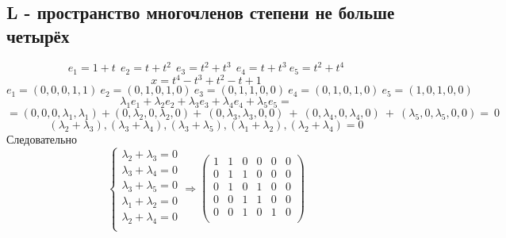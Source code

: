 \documentclass{article}
\begin{document}
\subsection*{L - пространство многочленов степени не больше четырёх}
$$
  e_1=1+t\ \ e_2=t+t^2\ \ e_3=t^2+t^3\ \ e_4=t+t^3\ e_5=t^2+t^4
$$$$
  x=t^4-t^3+t^2-t+1$$$$
  e_1=(0,0,0,1,1)\ e_2=(0,1,0,1,0){\ e}_3=(0,1,1,0,0)\ e_4=(0,1,0,1,0)\ e_5=(1,0,1,0,0) $$
$$
  \lambda_1e_1+\lambda_2e_2+\lambda_3e_3+\lambda_4e_4+\lambda_5e_5= $$$$
  =(0,0,0,\lambda_1,\lambda_1)+(0,\lambda_2,0,\lambda_2,0)+\ (0,\lambda_3,\lambda_3,0,0)\ +\ (0,\lambda_4,0,\lambda_4,0)\ +\ (\lambda_5,0,\lambda_5,0,0) =\ 0\ $$$$
  (\lambda_2+\lambda_3),(\lambda_3+\lambda_4),(\lambda_3+\lambda_5),(\lambda_1+\lambda_2),(\lambda_2+\lambda_4) =0
$$
Следовательно $$
  \left\{\begin{array}{c}
    \lambda_2+\lambda_3=0 \\
    \lambda_3+\lambda_4=0 \\
    \lambda_3+\lambda_5=0 \\
    \lambda_1+\lambda_2=0 \\
    \lambda_2+\lambda_4=0 \\
  \end{array}\right. \Rightarrow \left(\begin{array}{ccccc|c}
      1 & 1 & 0 & 0 & 0 & 0 \\
      0 & 1 & 1 & 0 & 0 & 0 \\
      0 & 1 & 0 & 1 & 0 & 0 \\
      0 & 0 & 1 & 1 & 0 & 0 \\
      0 & 0 & 1 & 0 & 1 & 0 \\
    \end{array}\right)$$
\end{document}
